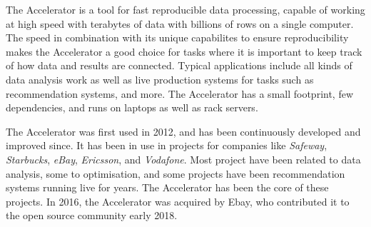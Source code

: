 
The Accelerator is a tool for fast reproducible data processing,
capable of working at high speed with terabytes of data with billions
of rows on a single computer.  The speed in combination with its
unique capabilites to ensure reproducibility makes the Accelerator a
good choice for tasks where it is important to keep track of how data
and results are connected.  Typical applications include all kinds of
data analysis work as well as live production systems for tasks such
as recommendation systems, and more.  The Accelerator has a small
footprint, few dependencies, and runs on laptops as well as rack
servers.

The Accelerator was first used in 2012, and has been continuously developed and
improved since.  It has been in use in projects for companies like
\textsl{Safeway}, \textsl{Starbucks}, \textsl{eBay}, \textsl{Ericsson},
and \textsl{Vodafone}.  Most project have been related to data
analysis, some to optimisation, and some projects have been
recommendation systems running live for years.  The Accelerator has
been the core of these projects.  In 2016, the Accelerator was
acquired by Ebay, who contributed it to the open source community
early 2018.

